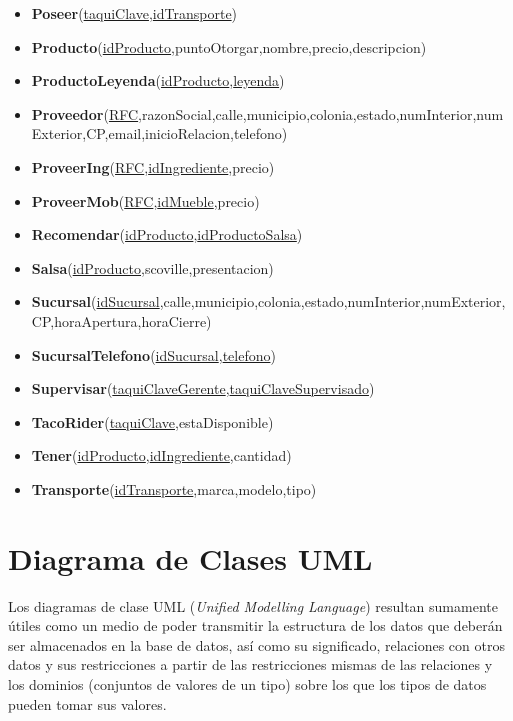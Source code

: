 \documentclass[11pt,letterpaper]{article}
\begin{document}
\begin{itemize}
\item \footnotesize{\textbf{Poseer}(\underline{taquiClave},\underline{idTransporte})}
\item \footnotesize{\textbf{Producto}(\underline{idProducto},puntoOtorgar,nombre,precio,descripcion)}
\item \footnotesize{\textbf{ProductoLeyenda}(\underline{idProducto},\underline{leyenda})}
\item \scriptsize{\textbf{Proveedor}(\underline{RFC},razonSocial,calle,municipio,colonia,estado,numInterior,numExterior,CP,email,inicioRelacion,telefono)}
\item \footnotesize{\textbf{ProveerIng}(\underline{RFC},\underline{idIngrediente},precio)}
\item \footnotesize{\textbf{ProveerMob}(\underline{RFC},\underline{idMueble},precio)}
\item \footnotesize{\textbf{Recomendar}(\underline{idProducto},\underline{idProductoSalsa})}
\item \footnotesize{\textbf{Salsa}(\underline{idProducto},scoville,presentacion)}
\item {\footnotesize \textbf{Sucursal}(\underline{idSucursal},calle,municipio,colonia,estado,numInterior,numExterior,CP,horaApertura,horaCierre)}
\item \footnotesize{\textbf{SucursalTelefono}(\underline{idSucursal},\underline{telefono})}
\item \footnotesize{\textbf{Supervisar}(\underline{taquiClaveGerente},\underline{taquiClaveSupervisado})}
\item \footnotesize{\textbf{TacoRider}(\underline{taquiClave},estaDisponible)}
\item \footnotesize{\textbf{Tener}(\underline{idProducto},\underline{idIngrediente},cantidad)}
\item \footnotesize{\textbf{Transporte}(\underline{idTransporte},marca,modelo,tipo)}



\end{itemize}
\section{Diagrama de Clases UML}

Los diagramas de clase UML (\textit{Unified Modelling Language}) resultan sumamente útiles como un medio de poder transmitir la estructura de los datos que deberán ser almacenados en la base de datos, así como su significado, relaciones con otros datos y sus restricciones a partir de las restricciones mismas de las relaciones y los dominios (conjuntos de valores de un tipo) sobre los que los tipos de datos pueden
tomar sus valores.\\
\end{document}
